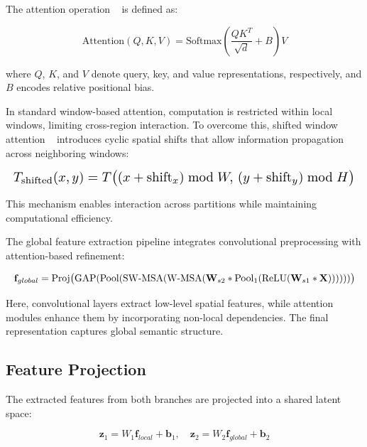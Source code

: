 \documentclass[12pt]{article}
\begin{document}
The attention operation ~\cite{b4} is defined as:

\begin{equation*}
\text{Attention}(Q,K,V)
=
\text{Softmax}\left(\frac{QK^T}{\sqrt{d}} + B\right)V
\end{equation*}

where $Q$, $K$, and $V$ denote query, key, and value representations, respectively, and $B$ encodes relative positional bias.

In standard window-based attention, computation is restricted within local windows, limiting cross-region interaction. To overcome this, shifted window attention ~\cite{b5} introduces cyclic spatial shifts that allow information propagation across neighboring windows:

\begin{equation*}
\resizebox{\columnwidth}{!}{$
T_{\text{shifted}}(x,y)
=
T\big((x+\text{shift}_x)\bmod W,\,(y+\text{shift}_y)\bmod H\big)
$}
\end{equation*}

This mechanism enables interaction across partitions while maintaining computational efficiency.

The global feature extraction pipeline integrates convolutional preprocessing with attention-based refinement:

\begin{equation*}
\resizebox{\columnwidth}{!}{$
\mathbf{f}_{global}
=
\mathrm{Proj}\big(
\mathrm{GAP}(
\mathrm{Pool}(
\mathrm{SW\text{-}MSA}(
\mathrm{W\text{-}MSA}(
\mathbf{W}_{s2} *
\mathrm{Pool}_1(
\mathrm{ReLU}(\mathbf{W}_{s1} * \mathbf{X})
)
)
)
)
)
\big)
$}
\end{equation*}

Here, convolutional layers extract low-level spatial features, while attention modules enhance them by incorporating non-local dependencies. The final representation captures global semantic structure.

\subsection{Feature Projection}

The extracted features from both branches are projected into a shared latent space:

\begin{equation*}
\mathbf{z}_1 = W_1 \mathbf{f}_{local} + \mathbf{b}_1,\quad
\mathbf{z}_2 = W_2 \mathbf{f}_{global} + \mathbf{b}_2
\end{equation*}
\end{document}
